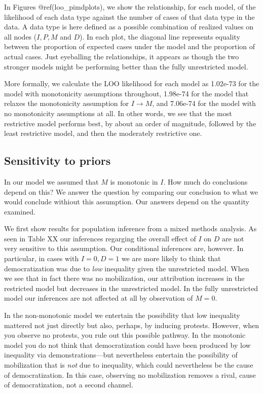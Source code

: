 \documentclass[
  12pt,
]{book}
\begin{document}
In Figures @ref(loo\_pimdplots), we show the relationship, for each model, of the likelihood of each data type against the number of cases of that data type in the data. A data type is here defined as a possible combination of realized values on all nodes (\(I, P, M\) and \(D\)). In each plot, the diagonal line represents equality between the proportion of expected cases under the model and the proportion of actual cases. Just eyeballing the relationships, it appears as though the two stronger models might be performing better than the fully unrestricted model.

More formally, we calculate the LOO likelihood for each model as 1.02e-73 for the model with monotonicity assumptions throughout, 1.98e-74 for the model that relaxes the monotonicity assumption for \(I \rightarrow M\), and 7.06e-74 for the model with no monotonicity assumptions at all. In other words, we see that the most restrictive model performs best, by about an order of magnitude, followed by the least restrictive model, and then the moderately restrictive one.

\hypertarget{sensitivity-to-priors}{%
\subsection{Sensitivity to priors}\label{sensitivity-to-priors}}

In our model we assumed that \(M\) is monotonic in \(I\). How much do conclusions depend on this? We answer the question by comparing our conclusion to what we would conclude withiout this assumption. Our answers depend on the quantity examined.

We first show results for population inference from a mixed methods analysis. As seen in Table XX our inferences regarging the overall effect of \(I\) on \(D\) are not very sensitive to this assumption. Our conditional inferences are, however. In particular, in cases with \(I=0, D=1\) we are more likely to think that democratization was due to \emph{low} inequality given the unrestricted model. When we see that in fact there was no mobilization, our attribution increases in the restricted model but decreases in the unrestricted model. In the fully unrestricted model our inferences are not affected at all by observation of \(M=0\).

In the non-monotonic model we entertain the possibility that low inequality mattered not just directly but also, perhaps, by inducing protests. However, when you observe no protests, you rule out this possible pathway. In the monotonic model you do not think that democratization could have been produced by low inequality via demonstrations---but nevertheless entertain the possibility of mobilization that is \emph{not} due to inequality, which could nevertheless be the cause of democratization. In this case, observing no mobilization removes a rival, cause of democratization, not a second channel.
\end{document}
